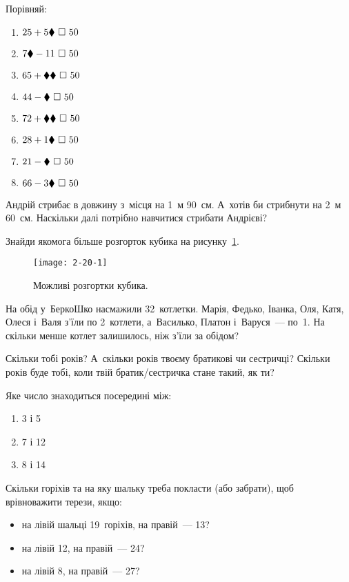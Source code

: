 Порівняй:
\begin{multicols}{2}
    \begin{enumerate}
        \item $25 + 5\hiddendigit \ \square \ 50$
        \item $7\hiddendigit - 11 \ \square \ 50$
        \item $65 + \hiddendigit\hiddendigit \ \square \ 50$
        \item $44 - \hiddendigit \ \square \ 50$
        \item $72 + \hiddendigit\hiddendigit \ \square \ 50$
        \item $28 + 1\hiddendigit \ \square \ 50$
        \item $21 - \hiddendigit \ \square \ 50$
        \item $66 - 3\hiddendigit \ \square \ 50$
    \end{enumerate}
\end{multicols}


\problem
Андрій стрибає в довжину з~місця на 1~м 90~см.
А~хотів би стрибнути на 2~м 60~см.
Наскільки далі потрібно навчитися стрибати Андрієві?


\problem
Знайди якомога більше розгорток кубика на рисунку~\ref{fig:cubes}.

\begin{figure}[h]
    \centering
    \texttt{[image: 2-20-1]}
    \caption{Можливі розгортки кубика.}
    \label{fig:cubes}
\end{figure}


\problem
На обід у~БеркоШко насмажили 32~котлетки.
Марія, Федько, Іванка, Оля, Катя, Олеся і~Валя з’їли по 2~котлети,
а~Василько, Платон і~Варуся~--- по~1.
На скільки менше котлет залишилось, ніж з’їли за обідом?


\problem
Скільки тобі років?
А~скільки років твоєму братикові чи сестричці?
Скільки років буде тобі, коли твій братик/сестричка стане такий, як ти?


\problem
Яке число знаходиться посередині між:
\begin{multicols}{3}
    \begin{enumerate}
        \item 3 і 5
        \item 7 і 12
        \item 8 і 14
    \end{enumerate}
\end{multicols}


\problem
Скільки горіхів та на яку шальку треба покласти (або забрати),
щоб врівноважити терези, якщо:
\begin{itemize}
    \item на лівій шальці 19~горіхів, на правій~--- 13?
    \item на лівій 12, на правій~--- 24?
    \item на лівій 8, на правій~--- 27?
\end{itemize}


